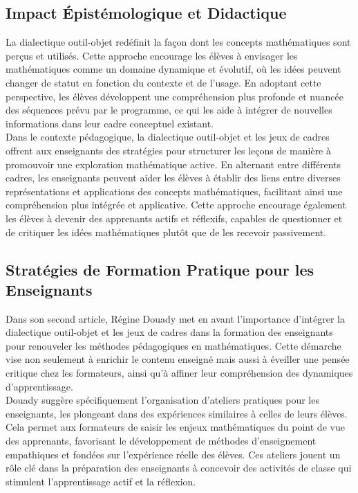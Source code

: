 \subsection{Impact Épistémologique et Didactique}

La dialectique outil-objet redéfinit la façon dont les concepts mathématiques sont perçus et utilisés.
Cette approche encourage les élèves à envisager les mathématiques comme un domaine dynamique et évolutif,
où les idées peuvent changer de statut en fonction du contexte et de l'usage.
En adoptant cette perspective,
les élèves développent une compréhension plus profonde et nuancée des séquences prévu par le programme,
ce qui les aide à intégrer de nouvelles informations dans leur cadre conceptuel existant.\\

Dans le contexte pédagogique,
la dialectique outil-objet et les jeux de cadres offrent aux enseignants des stratégies pour structurer les leçons de manière à promouvoir une exploration mathématique active.
En alternant entre différents cadres,
les enseignants peuvent aider les élèves à établir des liens entre diverses représentations et applications des concepts mathématiques,
facilitant ainsi une compréhension plus intégrée et applicative.
Cette approche encourage également les élèves à devenir des apprenants actifs et réflexifs,
capables de questionner et de critiquer les idées mathématiques plutôt que de les recevoir passivement.

\subsection{Stratégies de Formation Pratique pour les Enseignants}

Dans son second article,
Régine Douady met en avant l'importance d'intégrer la dialectique outil-objet et les jeux de cadres dans la formation des enseignants pour renouveler les méthodes pédagogiques en mathématiques.
Cette démarche vise non seulement à enrichir le contenu enseigné mais aussi à éveiller une pensée critique chez les formateurs,
ainsi qu'à affiner leur compréhension des dynamiques d'apprentissage.\\

Douady suggère spécifiquement l'organisation d'ateliers pratiques pour les enseignants,
les plongeant dans des expériences similaires à celles de leurs élèves.
Cela permet aux formateurs de saisir les enjeux mathématiques du point de vue des apprenants,
favorisant le développement de méthodes d'enseignement empathiques et fondées sur l'expérience réelle des élèves.
Ces ateliers jouent un rôle clé dans la préparation des enseignants à concevoir des activités de classe qui stimulent l'apprentissage actif et la réflexion.\\

